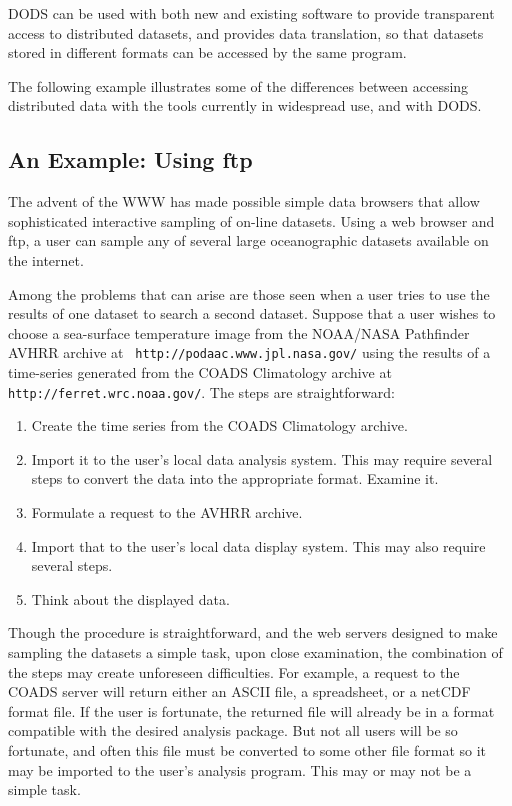 DODS can be used with both new and existing software to provide
transparent access to distributed datasets, and provides data
translation, so that datasets stored in different formats can be
accessed by the same program.

The following example illustrates some of the differences between
accessing distributed data with the tools currently in widespread use,
and with DODS.

\subsection{An Example: Using ftp}

The advent of the WWW has made possible simple data browsers that
allow sophisticated interactive sampling of on-line datasets. Using a
web browser and ftp, a user can sample any of several large
oceanographic datasets available on the internet. 

Among the problems that can arise are those seen when a user tries to
use the results of one dataset to search a second dataset. Suppose
that a user wishes to choose a sea-surface temperature image from the
NOAA/NASA Pathfinder AVHRR archive at {\tt
http://podaac.www.jpl.nasa.gov/} using the results of a time-series
generated from the COADS Climatology archive at {\tt
http://ferret.wrc.noaa.gov/}. The steps are straightforward:

\begin{enumerate}

\item Create the time series from the COADS Climatology archive.

\item Import it to the user's local data analysis system. This may
require several steps to convert the data into the appropriate
format. Examine it.

\item Formulate a request to the AVHRR archive.

\item Import that to the user's local data display system. This may
also require several steps. 

\item Think about the displayed data.

\end{enumerate}

Though the procedure is straightforward, and the web servers designed
to make sampling the datasets a simple task, upon close examination,
the combination of the steps may create unforeseen difficulties. For
example, a request to the COADS server will return either an ASCII
file, a spreadsheet, or a netCDF format file. If the user is
fortunate, the returned file will already be in a format compatible
with the desired analysis package. But not all users will be so
fortunate, and often this file must be converted to some other file
format so it may be imported to the user's analysis program. This may
or may not be a simple task.

